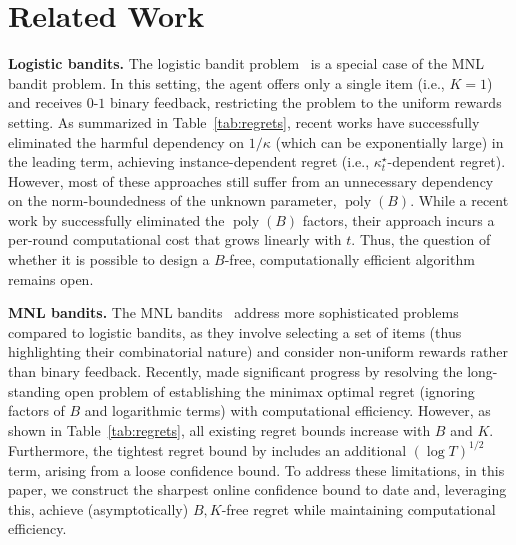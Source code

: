 \section{Related Work}
\label{sec:Related}
%
\textbf{Logistic bandits.}
%
The logistic bandit problem~\citep{dong2019performance, faury2020improved, abeille2021instance, faury2022jointly, lee2024improved, lee2024unified} is a special case of the MNL bandit problem. 
In this setting, the agent offers only a single item (i.e., $K=1$) and receives $0$-$1$ binary feedback, restricting the problem to the uniform rewards setting.
As summarized in Table~\ref{tab:regrets}, recent works have successfully eliminated the harmful dependency on $1/\kappa$ (which can be exponentially large) in the leading term, achieving instance-dependent regret (i.e., 
 $\kappa^\star_t$-dependent regret). 
However, most of these approaches still suffer from an unnecessary dependency on the norm-boundedness of the unknown parameter, $\operatorname{poly}(B)$.
While a recent work by \citet{lee2024unified} successfully eliminated the $\operatorname{poly}(B)$ factors, their approach incurs a per-round computational cost that grows linearly with $t$.
Thus, the question of whether it is possible to design a $B$-free, computationally efficient algorithm remains open.


\textbf{MNL bandits.}
%
The MNL bandits~\citep{agrawal2019mnl, agrawal2017thompson, ou2018multinomial, chen2020dynamic, oh2019thompson, oh2021multinomial, perivier2022dynamic, agrawal2023tractable, lee2024nearly} address more sophisticated problems compared to logistic bandits, as they involve selecting a set of items (thus highlighting their combinatorial nature) and consider non-uniform rewards rather than binary feedback.
%
Recently, \citet{lee2024nearly} made significant progress by resolving the long-standing open problem of establishing the minimax optimal regret (ignoring factors of $B$ and logarithmic terms) with computational efficiency. 
However, as shown in Table~\ref{tab:regrets}, all existing regret bounds increase with $B$ and $K$. 
Furthermore, the tightest regret bound by \citet{lee2024nearly} includes an additional $(\log T)^{1/2}$ term, arising from a loose confidence bound.
%
To address these limitations, in this paper, we construct the sharpest online confidence bound to date and, leveraging this, achieve (asymptotically) $B,K$-free regret while maintaining computational efficiency.


